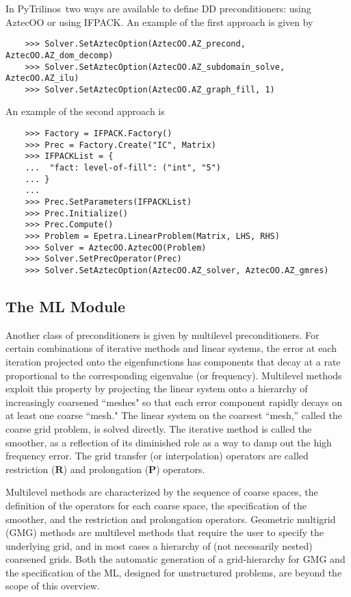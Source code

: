 \documentclass[10pt,relax]{SANDreport}
\newcommand{\PyTrilinos}{{PyTrilinos}}
\begin{document}
In \PyTrilinos\ two ways are available to define DD preconditioners:
using AztecOO or using IFPACK. An example of the first approach is
given by
\begin{verbatim}
    >>> Solver.SetAztecOption(AztecOO.AZ_precond, AztecOO.AZ_dom_decomp)
    >>> Solver.SetAztecOption(AztecOO.AZ_subdomain_solve, AztecOO.AZ_ilu)
    >>> Solver.SetAztecOption(AztecOO.AZ_graph_fill, 1)
\end{verbatim}
An example of the second approach is
\begin{verbatim}
    >>> Factory = IFPACK.Factory()
    >>> Prec = Factory.Create("IC", Matrix)
    >>> IFPACKList = {
    ...  "fact: level-of-fill": ("int", "5")
    ... }
    ... 
    >>> Prec.SetParameters(IFPACKList)
    >>> Prec.Initialize()
    >>> Prec.Compute()
    >>> Problem = Epetra.LinearProblem(Matrix, LHS, RHS)
    >>> Solver = AztecOO.AztecOO(Problem)
    >>> Solver.SetPrecOperator(Prec)
    >>> Solver.SetAztecOption(AztecOO.AZ_solver, AztecOO.AZ_gmres)
\end{verbatim}

\subsection{The ML Module}
\label{subsec:ml}

Another class of preconditioners is given by multilevel
preconditioners.  For certain combinations of iterative methods and
linear systems, the error at each iteration projected onto the
eigenfunctions has components that decay at a rate proportional to the
corresponding eigenvalue (or frequency).  Multilevel methods exploit
this property \cite{Briggs2000} by projecting the linear system onto a
hierarchy of increasingly coarsened ``meshes" so that each error
component rapidly decays on at least one coarse ``mesh."  The linear
system on the coarsest ``mesh,'' called the coarse grid problem, is
solved directly.  The iterative method is called the smoother, as a
reflection of its diminished role as a way to damp out the high
frequency error.  The grid transfer (or interpolation) operators are
called restriction ($\mathbf{R}$) and prolongation ($\mathbf{P}$)
operators.

Multilevel methods are characterized by the sequence of coarse spaces,
the definition of the operators for each coarse space, the
specification of the smoother, and the restriction and prolongation
operators.  Geometric multigrid (GMG) methods are multilevel methods
that require the user to specify the underlying grid, and in most
cases a hierarchy of (not necessarily nested) coarsened grids.  Both
the automatic generation of a grid-hierarchy for GMG and the
specification of the ML, designed for unstructured problems, are
beyond the scope of this overview.
\end{document}
